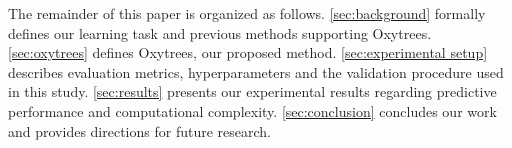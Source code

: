 \documentclass[sn-mathphys-num]{sn-jnl}%
\theoremstyle{thmstyleone}%
\theoremstyle{thmstyletwo}%
\theoremstyle{thmstylethree}%
\begin{document}
The remainder of this paper is organized as follows. \autoref{sec:background} formally defines our learning task and previous methods supporting Oxytrees. \autoref{sec:oxytrees} defines Oxytrees, our proposed method. \autoref{sec:experimental setup} describes evaluation metrics, hyperparameters and the validation procedure used in this study. \autoref{sec:results} presents our experimental results regarding predictive performance and computational complexity. \autoref{sec:conclusion} concludes our work and provides directions for future research.






% 




\end{document}

